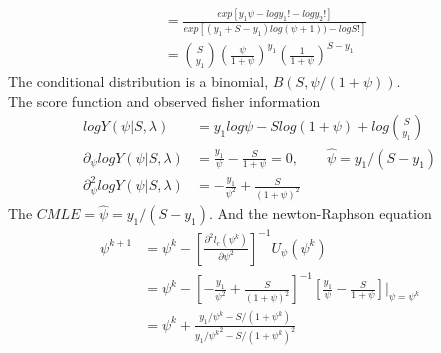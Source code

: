 \begin{itemize}
\begin{itemize}
\begin{align*}
			&= \frac{exp \left[ y_1 \psi -log y_1! - log y_2! \right] }{exp \left[ (y_1+ S-y_1) log(\psi + 1)) -log S!  \right]}\\
			&= {S \choose y_1} \left( \frac{\psi}{1+\psi}\right)^{y_1} \left(\frac{1}{1+\psi} \right)^{S-y_1}
		\end{align*}
		The conditional distribution is a binomial, $B(S, \psi/(1+\psi))$.\\
		The score function and observed fisher information 
		\begin{align*}
			log Y(\psi|S,\lambda) &= y_1 log \psi -S log(1+\psi) + log {S \choose y_1} \\
			\partial_{\psi} log Y(\psi|S,\lambda) &= \frac{y_1}{\psi} - \frac{S}{1+\psi} = 0, \qquad \hat{\psi} = y_1/(S-y_1)\\
			\partial^2_{\psi} log Y(\psi|S,\lambda) &= -\frac{y_1}{\psi^2} + \frac{S}{(1+\psi)^2}
		\end{align*}
		The $CMLE = \hat{\psi} = y_1/(S-y_1)$. And the newton-Raphson equation 
		\begin{align*}
			\psi^{k+1} &= \psi^{k} - \left[\frac{\partial^2 l_c(\psi^{k})}{\partial \psi^2} \right]^{-1} U_{\psi}(\psi^{k})\\
			&= \psi^{k} - \left[ -\frac{y_1}{\psi^2} + \frac{S}{(1+\psi)^2}\right]^{-1} \left[\frac{y_1}{\psi} - \frac{S}{1+\psi} \right]|_{\psi = \psi^{k}}\\
			&=  \psi^{k} + \frac{y_1/\psi^{k} - S/(1+\psi^{k})}{y_1/{\psi^{k}}^2 - S/(1+\psi^{k})^2}
		\end{align*}
	\end{itemize}
\end{itemize}

